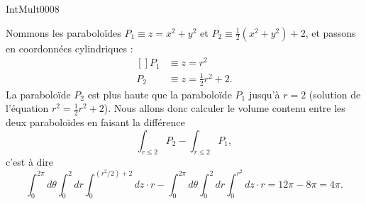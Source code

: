 
\begin{corrige}{IntMult0008}

	Nommons les paraboloïdes $P_1\equiv z=x^2+y^2$ et $P_2\equiv \frac{ 1 }{2}(x^2+y^2)+2$, et passons en coordonnées cylindriques :
	\begin{equation}
		\begin{aligned}[]
			P_1&\equiv z=r^2\\
			P_2&\equiv z=\frac{ 1 }{2}r^2+2.
		\end{aligned}
	\end{equation}
	La paraboloïde $P_2$ est plus haute que la paraboloïde $P_1$ jusqu'à $r=2$ (solution de l'équation $r^2=\frac{ 1 }{2}r^2+2$). Nous allons donc calculer le volume contenu entre les deux paraboloïdes en faisant la différence
	\begin{equation}
		\int_{r\leq 2}P_2-\int_{r\leq 2}P_1,
	\end{equation}
	c'est à dire
	\begin{equation}
		\int_0^{2\pi}d\theta\int_0^2dr\int_0^{(r^2/2)+2}dz\cdot r-\int_0^{2\pi}d\theta\int_0^2dr\int_0^{r^2}dz\cdot r=12\pi-8\pi=4\pi.
	\end{equation}
	
\end{corrige}
